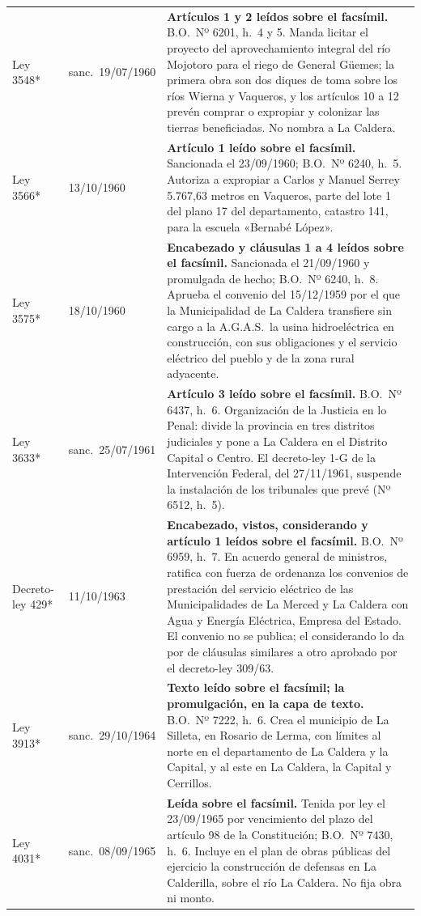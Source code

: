 \begin{longtable}{@{}p{3.2cm}p{1.9cm}p{7.9cm}@{}}
Ley 3548* & sanc.\ 19/07/1960 & \textbf{Artículos 1 y 2 leídos sobre el facsímil.} B.O.\ Nº 6201, h.\ 4 y 5. Manda licitar el proyecto del aprovechamiento integral del río Mojotoro para el riego de General Güemes; la primera obra son dos diques de toma sobre los ríos Wierna y Vaqueros, y los artículos 10 a 12 prevén comprar o expropiar y colonizar las tierras beneficiadas. No nombra a La Caldera. \\
Ley 3566* & 13/10/1960 & \textbf{Artículo 1 leído sobre el facsímil.} Sancionada el 23/09/1960; B.O.\ Nº 6240, h.\ 5. Autoriza a expropiar a Carlos y Manuel Serrey\index{Serrey, Carlos}\index{Serrey, Manuel} 5.767,63 metros en Vaqueros, parte del lote 1 del plano 17 del departamento, catastro 141, para la escuela «Bernabé López». \\
Ley 3575* & 18/10/1960 & \textbf{Encabezado y cláusulas 1 a 4 leídos sobre el facsímil.} Sancionada el 21/09/1960 y promulgada de hecho; B.O.\ Nº 6240, h.\ 8. Aprueba el convenio del 15/12/1959 por el que la Municipalidad de La Caldera transfiere sin cargo a la A.G.A.S.\ la usina hidroeléctrica en construcción, con sus obligaciones y el servicio eléctrico del pueblo y de la zona rural adyacente. \\
Ley 3633* & sanc.\ 25/07/1961 & \textbf{Artículo 3 leído sobre el facsímil.} B.O.\ Nº 6437, h.\ 6. Organización de la Justicia en lo Penal: divide la provincia en tres distritos judiciales y pone a La Caldera en el Distrito Capital o Centro. El decreto-ley 1-G de la Intervención Federal, del 27/11/1961, suspende la instalación de los tribunales que prevé (Nº 6512, h.\ 5). \\
Decreto-ley 429* & 11/10/1963 & \textbf{Encabezado, vistos, considerando y artículo 1 leídos sobre el facsímil.} B.O.\ Nº 6959, h.\ 7. En acuerdo general de ministros, ratifica con fuerza de ordenanza los convenios de prestación del servicio eléctrico de las Municipalidades de La Merced y La Caldera con Agua y Energía Eléctrica, Empresa del Estado. El convenio no se publica; el considerando lo da por de cláusulas similares a otro aprobado por el decreto-ley 309/63. \\
Ley 3913* & sanc.\ 29/10/1964 & \textbf{Texto leído sobre el facsímil; la promulgación, en la capa de texto.} B.O.\ Nº 7222, h.\ 6. Crea el municipio de La Silleta, en Rosario de Lerma, con límites al norte en el departamento de La Caldera y la Capital, y al este en La Caldera, la Capital y Cerrillos. \\
Ley 4031* & sanc.\ 08/09/1965 & \textbf{Leída sobre el facsímil.} Tenida por ley el 23/09/1965 por vencimiento del plazo del artículo 98 de la Constitución; B.O.\ Nº 7430, h.\ 6. Incluye en el plan de obras públicas del ejercicio la construcción de defensas en La Calderilla, sobre el río La Caldera. No fija obra ni monto. \\

\end{longtable}
